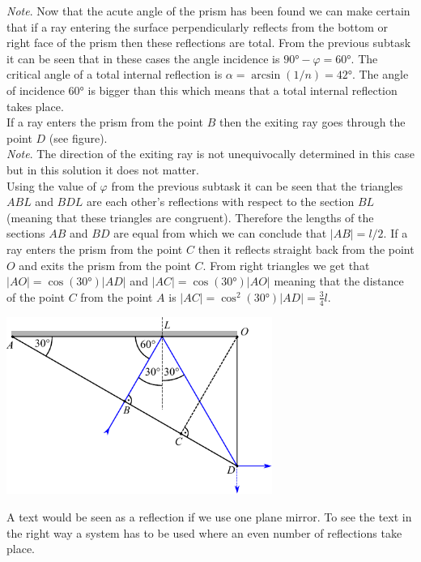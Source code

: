 \documentclass[11pt]{article}
\begin{document}
\emph{Note}. Now that the acute angle of the prism has been found we can make certain that if a ray entering the surface perpendicularly reflects from the bottom or right face of the prism then these reflections are total. From the previous subtask it can be seen that in these cases the angle incidence is $\ang{90}-\varphi=\ang{60}$. The critical angle of a total internal reflection is $\alpha=\arcsin(1/n)=\ang{42}$. The angle of incidence $\ang{60}$ is bigger than this which means that a total internal reflection takes place.\\
\osa If a ray enters the prism from the point $B$ then the exiting ray goes through the point $D$ (see figure). \\
\emph{Note}. The direction of the exiting ray is not unequivocally determined in this case but in this solution it does not matter.\\
Using the value of $\varphi$ from the previous subtask it can be seen that the triangles $ABL$ and $BDL$ are each other’s reflections with respect to the section $BL$ (meaning that these triangles are congruent). Therefore the lengths of the sections $AB$ and $BD$ are equal from which we can conclude that $|AB|=l/2$. If a ray enters the prism from the point $C$ then it reflects straight back from the point $O$ and exits the prism from the point $C$. From right triangles we get that $|AO|=\cos(\ang{30})|AD|$ and $|AC|=\cos(\ang{30})|AO|$ meaning that the distance of the point $C$ from the point $A$ is $|AC|=\cos^2(\ang{30})|AD|=\frac{3}{4}l$. 
\begin{center}
  \includegraphics[width=0.65\textwidth]{2014-v3g-04-periskoopprillid_lahendus_joonis3}
\end{center}
\osa A text would be seen as a reflection if we use one plane mirror. To see the text in the right way a system has to be used where an even number of reflections take place.
\probend
\bigskip

\end{document}
